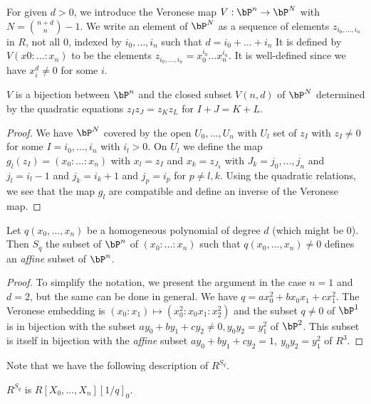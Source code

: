 For given $d>0$, we introduce the Veronese map $V: \bP^n\rightarrow \bP^N$ with $N = \binom{n+d}{n}-1$.
We write an element of $\bP^N$ as a sequence of elements $z_{i_0,\dots,i_n}$ in $R$, not all $0$,
indexed by $i_0,\dots,i_n$ such that $d = i_0+\dots+i_n$
It is defined by $V(x0:\dots:x_n)$ to be the elements $z_{i_0,\dots,i_n} = x_0^{i_0}\dots x_n^{i_n}$. It is well-defined
since we have $x_i^d\neq 0$ for some $i$.

\begin{proposition}\label{veronese}
  $V$ is a bijection between $\bP^n$ and the closed subset $V(n,d)$ of $\bP^N$ determined by the quadratic
  equations $z_Iz_J = z_Kz_L$ for $I+J=K+L$.
\end{proposition}

\begin{proof}
  We have $\bP^N$ covered by the open $U_0,\dots,U_n$ with $U_l$ set of $z_I$ with $z_I\neq 0$
  for some $I = i_0,\dots,i_n$ with $i_l>0$. On $U_l$ we define the map $g_l(z_I) = (x_0:\dots:x_n)$
  with $x_l = z_I$ and $x_k = z_{J_k}$ with $J_k = j_0,\dots,j_n$ and $j_l = i_l-1$ and $j_k = i_k+1$
  and $j_p = i_p$ for $p\neq l,k$. Using the quadratic relations, we see that the map $g_l$
  are compatible and define an inverse of the Veronese map.
\end{proof}

\begin{corollary}\label{affine}
  Let $q(x_0,\dots,x_n)$ be a homogeneous polynomial of degree $d$ (which might be $0$). Then $S_q$ the subset
  of $\bP^n$ of $(x_0:\dots:x_n)$ such that $q(x_0,\dots,x_n)\neq 0$
  defines an {\em affine} subset of $\bP^n$.
\end{corollary}

\begin{proof}
  To simplify the notation, we present the argument in the case $n=1$ and $d=2$, but the same can be done
  in general. We have $q = ax_0^2 + bx_0x_1+cx_1^2$. The Veronese embedding is $(x_0:x_1)\mapsto (x_0^2:x_0x_1:x_2^2)$
  and the subset $q\neq 0$ of $\bP^1$ is in bijection with the subset $ay_0+by_1+cy_2\neq 0, y_0y_2 = y_1^2$ of $\bP^2$.
  This subset is itself in bijection with the {\em affine} subset $ay_0+by_1+cy_2 = 1, ~y_0y_2=y_1^2$ of $R^3$.
\end{proof}

Note that we have the following description of $R^{S_q}$.

 \begin{lemma}
   $R^{S_q}$ is  $R[X_0,\dots,X_n][1/q]_0$.
\end{lemma}

